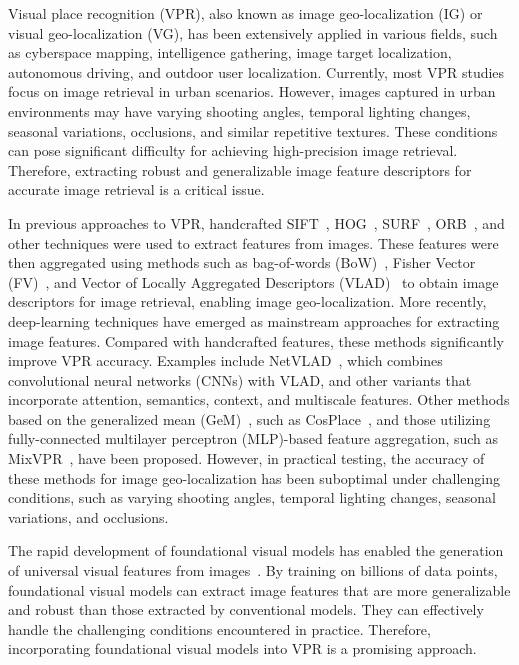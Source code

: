 % 
Visual place recognition (VPR), also known as image geo-localization (IG) or visual geo-localization (VG), has been extensively applied in various fields, such as cyberspace mapping, intelligence gathering, image target localization, autonomous driving, and outdoor user localization. Currently, most VPR studies focus on image retrieval in urban scenarios. However, images captured in urban environments may have varying shooting angles, temporal lighting changes, seasonal variations, occlusions, and similar repetitive textures. These conditions can pose significant difficulty for achieving high-precision image retrieval. Therefore, extracting robust and generalizable image feature descriptors for accurate image retrieval is a critical issue.

% 
In previous approaches to VPR, handcrafted SIFT~\cite{lowe_distinctive_2004}, HOG~\cite{dalal_histograms_2005}, SURF~\cite{leonardis_surf_2006}, ORB~\cite{rublee_orb_2011}, and other techniques were used to extract features from images. These features were then aggregated using methods such as bag-of-words (BoW)~\cite{tang_learning_2012}, Fisher Vector (FV)~\cite{jegou_aggregating_2010}, and Vector of Locally Aggregated Descriptors (VLAD)~\cite{jegou_aggregating_2012} to obtain image descriptors for image retrieval, enabling image geo-localization. More recently, deep-learning techniques have emerged as mainstream approaches for extracting image features. Compared with handcrafted features, these methods significantly improve VPR accuracy. Examples include NetVLAD~\cite{relja_netvlad_2018}, which combines convolutional neural networks (CNNs) with VLAD, and other variants that incorporate attention, semantics, context, and multiscale features. Other methods based on the generalized mean (GeM)~\cite{radenovic_fine-tuning_2019}, such as CosPlace~\cite{berton_rethinking_2022}, and those utilizing fully-connected multilayer perceptron (MLP)-based feature aggregation, such as MixVPR~\cite{ali-bey_mixvpr_2023}, have been proposed. However, in practical testing, the accuracy of these methods for image geo-localization has been suboptimal under challenging conditions, such as varying shooting angles, temporal lighting changes, seasonal variations, and occlusions. 

% 
 The rapid development of foundational visual models has enabled the generation of universal visual features from images~\cite{oquab_dinov2_2023}. By training on billions of data points, foundational visual models can extract image features that are more generalizable and robust than those extracted by conventional models. They can effectively handle the challenging conditions encountered in practice. Therefore, incorporating foundational visual models into VPR is a promising approach.

